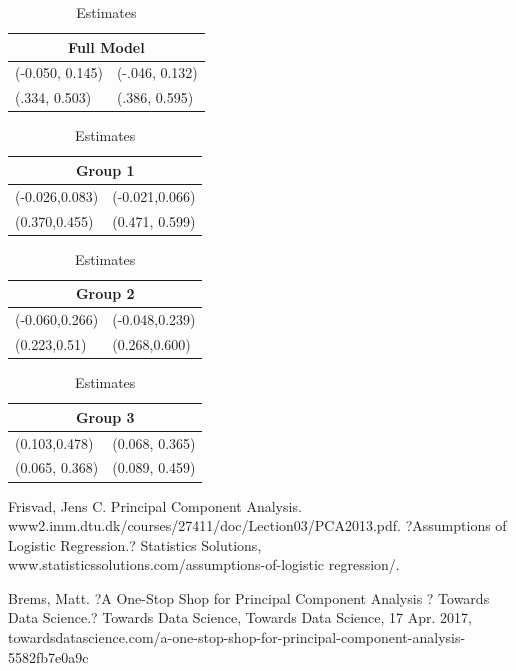 \documentclass[12pt]{article}
\begin{document}
\begin{table}[H]
\begin{tabular}{ |p{3cm}|p{3cm}|  }
\hline
\multicolumn{2}{|c|}{Full Model} \\
\hline
(-0.050, 0.145) & (-.046, 0.132) \\
\hline
(.334, 0.503) &  (.386, 0.595) \\
\hline
\end{tabular}
\quad
\begin{tabular}{ |p{3cm}|p{3cm}|  }
\hline
\multicolumn{2}{|c|}{Group 1} \\
\hline
(-0.026,0.083) & (-0.021,0.066) \\
\hline
(0.370,0.455) &  (0.471, 0.599) \\
\hline
\end{tabular}
\quad
\begin{tabular}{ |p{3cm}|p{3cm}|  }
\hline
\multicolumn{2}{|c|}{Group 2} \\
\hline
(-0.060,0.266) & (-0.048,0.239) \\
\hline
(0.223,0.51) &  (0.268,0.600) \\
\hline
\end{tabular}
\quad
\begin{tabular}{ |p{3cm}|p{3cm}|  }
\hline
\multicolumn{2}{|c|}{Group 3} \\
\hline
(0.103,0.478) & (0.068, 0.365) \\
\hline
(0.065, 0.368) & (0.089, 0.459)\\
\hline

\end{tabular}
\caption{Estimates}
\end{table}

\newpage





Frisvad, Jens C. Principal Component Analysis. www2.imm.dtu.dk/courses/27411/doc/Lection03/PCA2013.pdf.
?Assumptions of Logistic Regression.? Statistics Solutions, www.statisticssolutions.com/assumptions-of-logistic regression/.

Brems, Matt. ?A One-Stop Shop for Principal Component Analysis ? Towards Data Science.? Towards Data Science, Towards Data Science, 17 Apr. 2017, towardsdatascience.com/a-one-stop-shop-for-principal-component-analysis-5582fb7e0a9c
\end{document}
